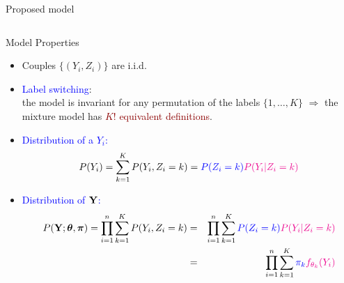 \documentclass{beamer}\usepackage[]{graphicx}\usepackage[]{color}
\newcommand{\blue}[1]{\textcolor{blue}{#1}}
\newcommand{\emphase}[1]{\textcolor{darkred}{#1}}
\newcommand{\Ybf}{{\bf Y}}
\newcommand{\pibf}{\mbox{\mathversion{bold}{$\pi$}}}
\newcommand{\thetabf}{\mbox{\mathversion{bold}{$\theta$}}}
\begin{document}
\begin{frame}[fragile]{Proposed model}
\begin{columns}
\begin{column}{0.45\textwidth}
  \end{column}
  \end{columns}
\end{frame}

\begin{frame}[fragile]{Model Properties}
\begin{itemize}
\item Couples $\{(Y_i, Z_i)\}$ are i.i.d.
\item \blue{Label switching}:\\ the model is invariant for any permutation of the labels $\{1,
  \dots, K\}$ $\Rightarrow$ the mixture model has \emphase{$K!$
    equivalent definitions}.
\item\blue{Distribution of a $Y_i$:}\\
$$P(Y_i)=\sum_{k=1}^K P(Y_i, Z_i=k)=\textcolor{blue}{P(Z_i=k)} \textcolor{magenta}{P(Y_i | Z_i=k)} $$
\item\blue{Distribution of $\Ybf$:}\\
{\small
\begin{eqnarray*}
P(\Ybf ; \thetabf, \pibf)= \prod_{i=1}^n \sum_{k=1}^K P(Y_i , Z_i=k)  
&=& \prod_{i=1}^n \sum_{k=1}^K \textcolor{blue}{P(Z_i=k)} \textcolor{magenta}{P(Y_i | Z_i=k)} \\ 
&=& \prod_{i=1}^n \sum_{k=1}^K \textcolor{blue}{\pi_k} \textcolor{magenta}{f_{\theta_k}(Y_i)} 
\end{eqnarray*}
}
\end{itemize}
\end{frame}
\end{document}
